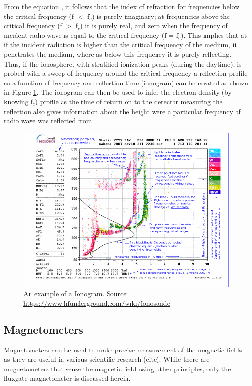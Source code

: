 \documentclass[crop=false,class=mitthesis,oneside,font=12pt]{standalone}
\begin{document}
From the equation \theequation, it follows that  the index of refraction for frequencies below the critical frequency (f $<$ f$_c$) is purely imaginary; at frequencies above the critical frequency (f $>$ f$_c$) it is purely real, and zero when the frequency of incident radio wave is equal to the critical frequency (f = f$_c$). This implies that at if the incident radiation is higher than the critical frequency of the medium, it penetrates the medium, where as below this frequency it is purely reflecting. Thus, if the ionosphere, with stratified ionization peaks (during the daytime), is probed with a sweep of frequency around the critical frequency a reflection profile as a function of frequency and reflection time (ionogram) can be created as shown in Figure \ref{fig:digi_s}. The ionogram can then be used to infer the electron density (by knowing f$_c$) profile as the time of return on to the detector measuring the reflection also gives information about the height were a particular frequency of radio wave was reflected from.
\begin{figure}[H]
	\centering\includegraphics[width=30pc]{HAARP_ionogram.png}
	\caption{An example of a Ionogram. Source: \url{https://www.hfunderground.com/wiki/Ionosonde}}
	\label{fig:digi_s}
\end{figure}


\subsection{Magnetometers}
Magnetometers can be used to make precise measurement of the magnetic fields as they are useful in various scientific research (cite). While there are magnetometers that sense the magnetic field using other principles, only the fluxgate magnetometer is discussed herein. 
\end{document}

